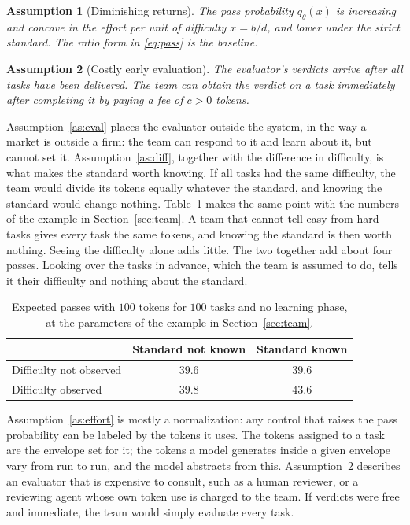\documentclass[11pt]{article}
\newtheorem{assumption}{Assumption}
\begin{document}
\begin{assumption}[Diminishing returns]\label{as:returns}
The pass probability $q_\theta(x)$ is increasing and concave in the effort per unit of difficulty $x=b/d$, and lower under the strict standard. The ratio form in \eqref{eq:pass} is the baseline.
\end{assumption}

\begin{assumption}[Costly early evaluation]\label{as:fee}
The evaluator's verdicts arrive after all tasks have been delivered. The team can obtain the verdict on a task immediately after completing it by paying a fee of $c>0$ tokens.
\end{assumption}

Assumption~\ref{as:eval} places the evaluator outside the system, in the way a market is outside a firm: the team can respond to it and learn about it, but cannot set it. Assumption~\ref{as:diff}, together with the difference in difficulty, is what makes the standard worth knowing. If all tasks had the same difficulty, the team would divide its tokens equally whatever the standard, and knowing the standard would change nothing. Table~\ref{tab:complements} makes the same point with the numbers of the example in Section~\ref{sec:team}. A team that cannot tell easy from hard tasks gives every task the same tokens, and knowing the standard is then worth nothing. Seeing the difficulty alone adds little. The two together add about four passes. Looking over the tasks in advance, which the team is assumed to do, tells it their difficulty and nothing about the standard.

\begin{table}[htbp]
\centering
\small
\begin{tabular}{@{}lcc@{}}
\toprule
 & Standard not known & Standard known \\
\midrule
Difficulty not observed & $39.6$ & $39.6$ \\
Difficulty observed & $39.8$ & $43.6$ \\
\bottomrule
\end{tabular}
\caption{Expected passes with $100$ tokens for $100$ tasks and no learning phase, at the parameters of the example in Section~\ref{sec:team}.}
\label{tab:complements}
\end{table}

Assumption~\ref{as:effort} is mostly a normalization: any control that raises the pass probability can be labeled by the tokens it uses. The tokens assigned to a task are the envelope set for it; the tokens a model generates inside a given envelope vary from run to run, and the model abstracts from this. Assumption~\ref{as:fee} describes an evaluator that is expensive to consult, such as a human reviewer, or a reviewing agent whose own token use is charged to the team. If verdicts were free and immediate, the team would simply evaluate every task.
\end{document}
